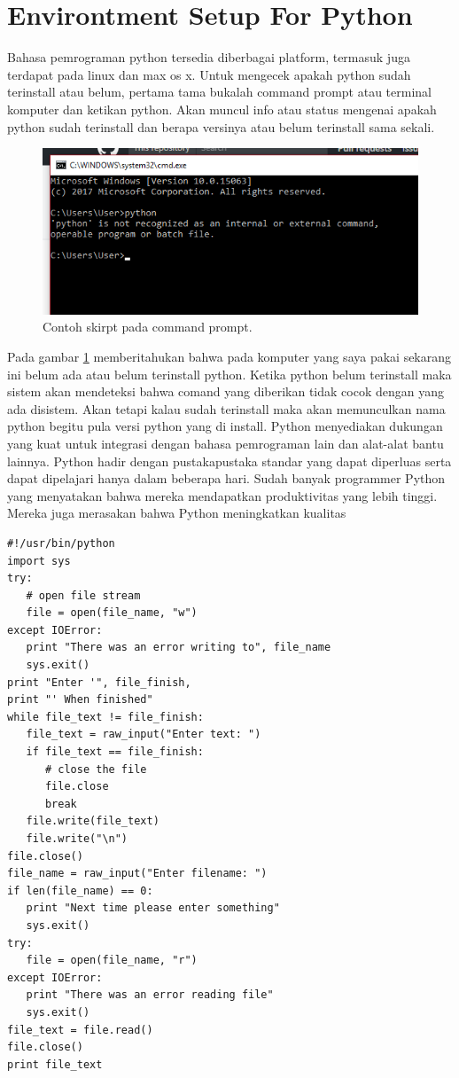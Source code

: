 \section{Environtment Setup For Python}
Bahasa pemrograman python tersedia diberbagai platform, termasuk juga terdapat pada 
linux dan max os x. Untuk mengecek apakah python sudah terinstall atau belum, pertama 
tama bukalah command prompt atau terminal komputer dan ketikan python. Akan muncul info 
atau status mengenai apakah python sudah terinstall dan berapa versinya atau belum terinstall sama sekali.
  \begin{figure}[ht]
	\centerline{\includegraphics[width=1\textwidth]{Plagiarisme/cmd.png}}
	\caption{Contoh skirpt pada command prompt.}
	\label{cmd}
	\end{figure}
Pada gambar \ref{cmd} memberitahukan bahwa pada komputer yang saya pakai sekarang ini belum ada atau belum terinstall python.
Ketika python belum terinstall maka sistem akan mendeteksi bahwa comand yang diberikan tidak cocok dengan yang ada disistem. 
Akan tetapi kalau sudah terinstall maka akan memunculkan nama python begitu pula versi python yang di install.
Python menyediakan dukungan yang kuat untuk integrasi dengan bahasa pemrograman lain dan alat-alat bantu lainnya. 
Python hadir dengan pustakapustaka standar yang dapat diperluas serta dapat dipelajari hanya dalam beberapa hari.
Sudah banyak programmer Python yang menyatakan bahwa mereka mendapatkan produktivitas yang lebih tinggi. 
Mereka juga merasakan bahwa Python meningkatkan kualitas 
\begin{verbatim}
#!/usr/bin/python
import sys
try:
   # open file stream
   file = open(file_name, "w")
except IOError:
   print "There was an error writing to", file_name
   sys.exit()
print "Enter '", file_finish,
print "' When finished"
while file_text != file_finish:
   file_text = raw_input("Enter text: ")
   if file_text == file_finish:
      # close the file
      file.close
      break
   file.write(file_text)
   file.write("\n")
file.close()
file_name = raw_input("Enter filename: ")
if len(file_name) == 0:
   print "Next time please enter something"
   sys.exit()
try:
   file = open(file_name, "r")
except IOError:
   print "There was an error reading file"
   sys.exit()
file_text = file.read()
file.close()
print file_text
\end{verbatim}

